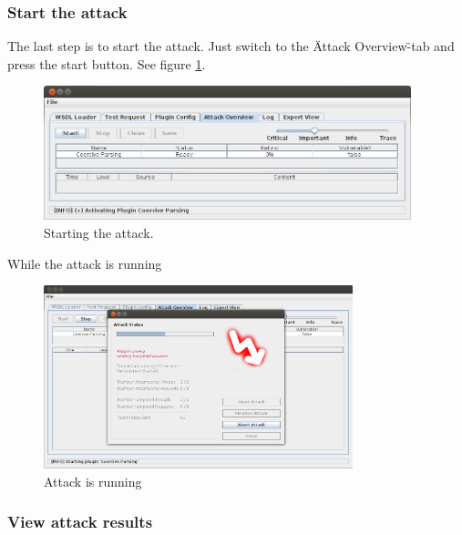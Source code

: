 \subsubsection{Start the attack}
\label{sec:starting_the_attacks}

The last step is to start the attack. 
Just switch to the \"Attack Overview\"-tab and press the start button. See figure \ref{fig:dosStep4}.

\begin{figure}[H]
    \begin{center}
        \includegraphics[width=0.95\textwidth]{img/dosStep4.png}
    \end{center}
    \caption{Starting the attack.}
    \label{fig:dosStep4}
\end{figure}

While the attack is running
\begin{figure}[H]
    \begin{center}
        \includegraphics[width=0.8\textwidth]{img/dosStep4_1.png}
    \end{center}
    \caption{Attack is running}
    \label{fig:dosStep4_1}
\end{figure}


\subsubsection{View attack results}
\label{sec:view_results}

